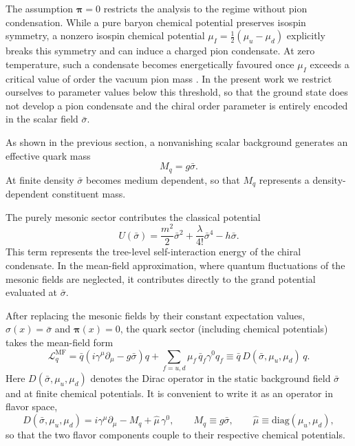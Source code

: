 The assumption $\boldsymbol{\pi}=0$ restricts the analysis to the
regime without pion condensation.
While a pure baryon chemical potential preserves isospin symmetry,
a nonzero isospin chemical potential
\(
\mu_I = \tfrac{1}{2}(\mu_u-\mu_d)
\)
explicitly breaks this symmetry and can induce a charged pion
condensate.
At zero temperature, such a condensate becomes energetically favoured
once $\mu_I$ exceeds a critical value of order the vacuum pion mass
\cite{SonStephanov2001,Buballa2005}.
In the present work we restrict ourselves to parameter values below
this threshold, so that the ground state does not develop a pion
condensate and the chiral order parameter is entirely encoded in the
scalar field $\bar{\sigma}$.

As shown in the previous section, a nonvanishing scalar background
generates an effective quark mass
\begin{equation}
M_q = g \bar{\sigma} .
\end{equation}
At finite density $\bar{\sigma}$ becomes medium dependent,
so that $M_q$ represents a density-dependent constituent mass.

The purely mesonic sector contributes the classical potential
\begin{equation}
U(\bar{\sigma}) =
\frac{m^2}{2}\bar{\sigma}^2
+ \frac{\lambda}{4!}\bar{\sigma}^4
- h \bar{\sigma}.
\label{eq:classical_mesonic_potential}
\end{equation}
This term represents the tree-level self-interaction energy of the
chiral condensate.
In the mean-field approximation, where quantum fluctuations of the
mesonic fields are neglected, it contributes directly to the grand
potential evaluated at $\bar{\sigma}$.

After replacing the mesonic fields by their constant expectation
values, $\sigma(x)=\bar{\sigma}$ and $\boldsymbol{\pi}(x)=0$, the quark
sector (including chemical potentials) takes the mean-field form
\begin{equation}
\mathcal{L}_q^{\mathrm{MF}}
=
\bar q\left(i\gamma^\mu\partial_\mu - g\bar{\sigma}\right)q
+\sum_{f=u,d}\mu_f\,\bar q_f\gamma^0 q_f
\equiv
\bar q\,D(\bar{\sigma},\mu_u,\mu_d)\,q .
\label{eq:Lq_MF_DiracOp}
\end{equation}
Here $D(\bar{\sigma},\mu_u,\mu_d)$ denotes the Dirac operator in the
static background field $\bar{\sigma}$ and at finite chemical potentials.
It is convenient to write it as an operator in flavor space,
\begin{equation}
D(\bar{\sigma},\mu_u,\mu_d)
=
i\gamma^\mu\partial_\mu - M_q + \hat\mu\,\gamma^0,
\qquad
M_q \equiv g\bar{\sigma},
\qquad
\hat\mu \equiv \mathrm{diag}(\mu_u,\mu_d),
\label{eq:Dirac_operator_def}
\end{equation}
so that the two flavor components couple to their respective chemical
potentials.

